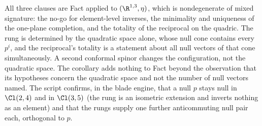 All three clauses are Fact  applied to $(\R^{1,3}, \eta)$, which is nondegenerate of mixed signature: the no-go for element-level inverses, the minimality and uniqueness of the one-plane completion, and the totality of the reciprocal on the quadric. The rung is determined by the quadratic space alone, whose null cone contains every $p^{i}$, and the reciprocal's totality is a statement about all null vectors of that cone simultaneously. A second conformal spinor changes the configuration, not the quadratic space. The corollary adds nothing to Fact  beyond the observation that its hypotheses concern the quadratic space and not the number of null vectors named. The script confirms, in the blade engine, that a null $p$ stays null in $\Cl(2,4)$ and in $\Cl(3,5)$ (the rung is an isometric extension and inverts nothing as an element) and that the rungs supply one further anticommuting null pair each, orthogonal to $p$.
